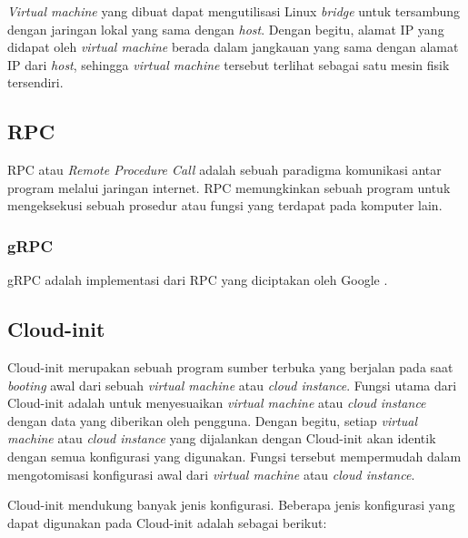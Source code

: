 \emph{Virtual machine} yang dibuat dapat mengutilisasi Linux
\emph{bridge} untuk tersambung dengan jaringan lokal yang sama dengan \emph{host}.
Dengan begitu, alamat IP yang didapat oleh \emph{virtual machine} berada dalam jangkauan
yang sama dengan alamat IP dari \emph{host}, sehingga \emph{virtual machine} tersebut
terlihat sebagai satu mesin fisik tersendiri.

\subsection{RPC}

RPC atau \emph{Remote Procedure Call} adalah sebuah paradigma komunikasi antar program
melalui jaringan internet. RPC memungkinkan sebuah program untuk mengeksekusi sebuah
prosedur atau fungsi yang terdapat pada komputer lain.

\subsubsection{gRPC}

gRPC adalah implementasi dari RPC yang diciptakan oleh Google \parencite{grpc-website-docs-overview}.

\subsection{Cloud-init}

Cloud-init merupakan sebuah program sumber terbuka yang berjalan pada saat
\emph{booting} awal dari sebuah \emph{virtual machine} atau \emph{cloud instance}.
Fungsi utama dari Cloud-init adalah untuk menyesuaikan \emph{virtual machine}
atau \emph{cloud instance} dengan data yang diberikan oleh pengguna. Dengan begitu,
setiap \emph{virtual machine} atau \emph{cloud instance} yang dijalankan dengan Cloud-init
akan identik dengan semua konfigurasi yang digunakan. Fungsi tersebut mempermudah dalam 
mengotomisasi konfigurasi awal dari \emph{virtual machine} atau \emph{cloud instance}.

Cloud-init mendukung banyak jenis konfigurasi. Beberapa jenis konfigurasi yang dapat digunakan
pada Cloud-init adalah sebagai berikut:

